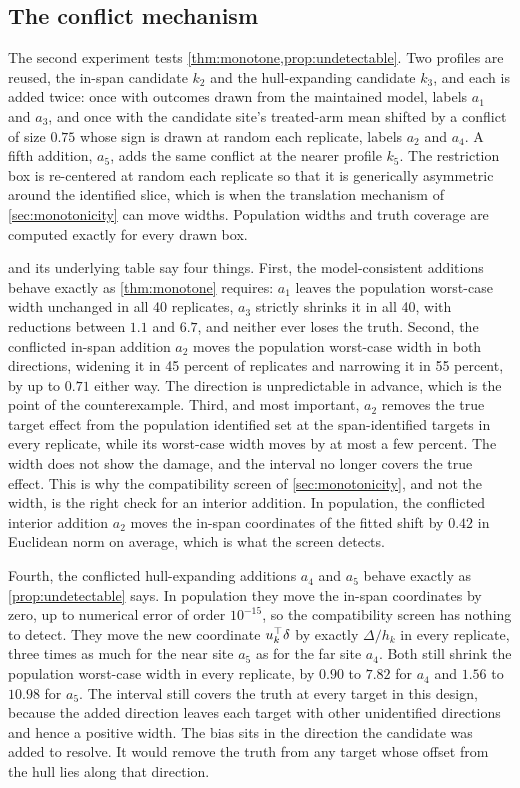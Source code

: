 \subsection{The conflict mechanism}
\label{subsec:sim-monotonicity}

The second experiment tests \cref{thm:monotone,prop:undetectable}. Two
profiles are reused, the in-span candidate $k_2$ and the hull-expanding
candidate $k_3$, and each is added twice: once with outcomes drawn from
the maintained model, labels $a_1$ and $a_3$, and once with the
candidate site's treated-arm mean shifted by a conflict of size $0.75$
whose sign is drawn at random each replicate, labels $a_2$ and $a_4$. A
fifth addition, $a_5$, adds the same conflict at the nearer profile
$k_5$. The restriction box is re-centered at random each
replicate so that it is generically asymmetric around the identified
slice, which is when the translation mechanism of
\cref{sec:monotonicity} can move widths. Population widths and truth
coverage are computed exactly for every drawn box.

 and its underlying table say four things.
First, the model-consistent additions behave exactly as
\cref{thm:monotone} requires: $a_1$ leaves the population worst-case
width unchanged in all 40 replicates, $a_3$ strictly shrinks it in all
40, with reductions between $1.1$ and $6.7$, and neither ever loses the
truth. Second, the conflicted in-span addition $a_2$ moves the
population worst-case width in both directions, widening it in 45
percent of replicates and narrowing it in 55 percent, by up to $0.71$
either way. The direction is unpredictable in advance, which is the
point of the counterexample. Third, and most important, $a_2$ removes the true target effect from the
population identified set at the span-identified targets in every
replicate, while its worst-case width moves by at most a few percent.
The width does not show the damage, and the interval no longer covers
the true effect. This is why the compatibility screen of
\cref{sec:monotonicity}, and not the width, is the right check for an
interior addition. In population, the conflicted interior addition
$a_2$ moves the in-span coordinates of the fitted shift by $0.42$ in
Euclidean norm on average, which is what the screen detects.

Fourth, the conflicted hull-expanding additions $a_4$ and $a_5$ behave
exactly as \cref{prop:undetectable} says. In population they move the
in-span coordinates by zero, up to numerical error of order $10^{-15}$,
so the compatibility screen has nothing to detect. They move the new
coordinate $u_{k}^\top\delta$ by exactly $\Delta/h_k$ in every
replicate, three times as much for the near site $a_5$ as for the far
site $a_4$. Both still shrink the population worst-case width in every
replicate, by $0.90$ to $7.82$ for $a_4$ and $1.56$ to $10.98$ for $a_5$.
The interval still covers the truth at every target in this design,
because the added direction leaves each target with other unidentified
directions and hence a positive width. The bias sits in the direction
the candidate was added to resolve. It would remove the truth from any
target whose offset from the hull lies along that direction.

